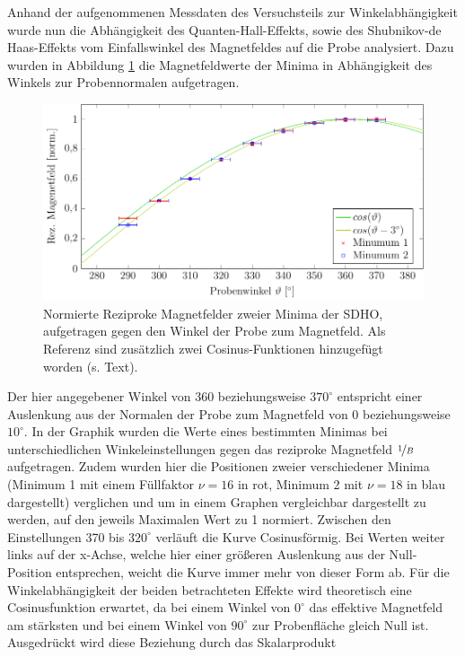 

Anhand der aufgenommenen Messdaten des Versuchsteils zur Winkelabhängigkeit wurde nun die Abhängigkeit des Quanten-Hall-Effekts, sowie des Shubnikov-de Haas-Effekts vom Einfallswinkel des Magnetfeldes auf die Probe analysiert.
Dazu wurden in Abbildung \ref{fig:winkel_ausw} die Magnetfeldwerte der Minima in Abhängigkeit des Winkels zur Probennormalen aufgetragen.
\begin{figure}[h]
	\centering
	\includegraphics[scale=1]{graphs/winkel/auswertung.pdf}
	\caption[Auswertung der Winkelvariation]{
		Normierte Reziproke Magnetfelder zweier Minima der SDHO, aufgetragen gegen den Winkel der Probe zum Magnetfeld. Als Referenz sind zusätzlich zwei Cosinus-Funktionen hinzugefügt worden (s. Text).
	}
	\label{fig:winkel_ausw}
\end{figure}
Der hier angegebener Winkel von 360 beziehungsweise $370^\circ$ entspricht einer Auslenkung aus der Normalen der Probe zum Magnetfeld von 0 beziehungsweise $10^\circ$. In der Graphik wurden die Werte eines bestimmten Minimas bei unterschiedlichen Winkeleinstellungen gegen das reziproke Magnetfeld $\nicefrac{1}{B}$ aufgetragen. Zudem wurden hier die Positionen zweier verschiedener Minima (Minimum 1 mit einem Füllfaktor $\nu=16$ in rot, Minimum 2 mit $\nu=18$ in blau dargestellt) verglichen und um in einem Graphen vergleichbar dargestellt zu werden, auf den jeweils Maximalen Wert zu 1 normiert. 
Zwischen den Einstellungen 370 bis $320^{\circ}$ verläuft die Kurve Cosinusförmig. Bei Werten weiter links auf der x-Achse, welche hier einer größeren Auslenkung aus der Null-Position entsprechen, weicht die Kurve immer mehr von dieser Form ab. Für die Winkelabhängigkeit der beiden betrachteten Effekte wird theoretisch eine Cosinusfunktion erwartet, da bei einem Winkel von $0^{\circ}$ das effektive Magnetfeld am stärksten und bei einem Winkel von $90^{\circ}$ zur Probenfläche gleich Null ist. Ausgedrückt wird diese Beziehung durch das Skalarprodukt

